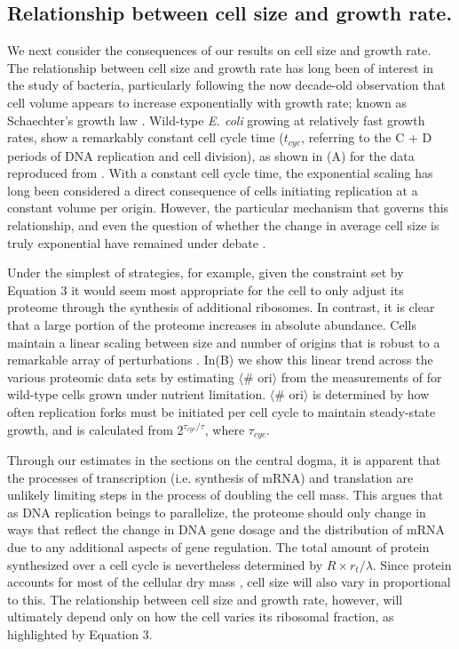 \subsection{Relationship between cell size and growth rate.}

We next consider the consequences of our results on cell size and growth rate.
The relationship between cell size and growth rate has long been of interest in
the study of bacteria, particularly following the now decade-old observation
that cell volume appears to increase exponentially with growth rate; known as
Schaechter's growth law  \citep{schaechter1958, taheriaraghi2015}. Wild-type
\textit{E. coli} growing at relatively fast growth rates, show a remarkably
constant cell cycle time ($t_{cyc}$, referring to the C + D periods of DNA
replication and cell division), as shown in (A) for
the data reproduced from \citep{si2017}. With a constant cell cycle time, the
exponential scaling has long been considered a direct consequence of cells
initiating replication at a constant volume per origin. However, the particular
mechanism that governs this relationship, and even the question of whether the
change in average cell size is truly exponential  have remained under debate
\citep{si2017, harris2018}.

Under the simplest of strategies, for example, given the constraint set by
Equation 3 it would seem most appropriate for the cell to only adjust its
proteome through the synthesis of additional ribosomes. In contrast, it is clear
that a large portion of the proteome increases in absolute abundance. Cells
maintain a linear scaling between size and number of origins that is robust to a
remarkable array of perturbations \citep{si2017}.
In(B) we show this linear trend across the various
proteomic data sets by estimating $\langle$\# ori$\rangle$ from the measurements
of \cite{si2017} for wild-type cells grown under nutrient limitation.
$\langle$\# ori$\rangle$ is determined by how often replication forks must be
initiated per cell cycle to maintain steady-state growth, and is calculated from
2$^{\tau_{cyc} / \tau}$, where $\tau_{cyc}$.

Through our estimates in the sections on the central dogma, it is
apparent that the processes of transcription (i.e. synthesis of mRNA) and
translation are unlikely limiting steps in the process of doubling the
cell mass. This argues that as DNA replication beings to parallelize, the
proteome should only change in ways that reflect the change in DNA gene dosage
and the distribution of mRNA due to any additional aspects of gene regulation.
The total amount of protein synthesized over a cell cycle is nevertheless
determined by $R \times r_t / \lambda$. Since protein accounts for most of
the cellular dry mass \citep{bremer2008, basan2015}, cell size will also vary
in proportional to this. The relationship between cell size and growth rate,
however, will ultimately depend only on how the cell varies its ribosomal
fraction, as highlighted by Equation 3.

